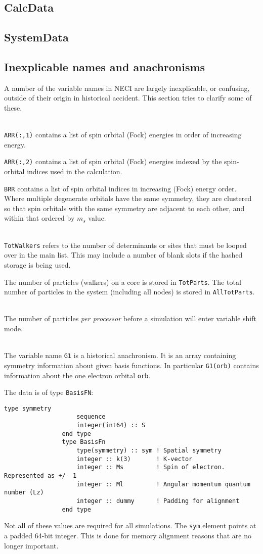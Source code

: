 \documentclass[a4paper,notitlepage]{scrreprt}
\newcommand\headitem[1]{\needspace{1.5\baselineskip}\item[{\boldmath #1 \nopagebreak}] \hfill \\ \nopagebreak}
\let\code\lstinline
\begin{document}
\subsection{\ttfamily CalcData}
\subsection{\ttfamily SystemData}

\subsection{Inexplicable names and anachronisms}
	A number of the variable names in NECI are largely inexplicable, or
	confusing, outside of their origin in historical accident. This section
	tries to clarify some of these.

	\begin{description}
		\headitem{ARR, BRR}
			\code{ARR(:,1)} contains a list of spin orbital (Fock)
			energies in	order of increasing energy.

			\code{ARR(:,2)} contains a list of spin orbital (Fock)
			energies indexed by the spin-orbital indices used in the
			calculation.

			\code{BRR} contains a list of spin orbital indices in
			increasing (Fock) energy order. Where multiple degenerate orbitals
			have the same symmetry, they are clustered so that spin orbitals
			with the same symmetry are adjacent to each other, and within that
			ordered by $m_s$ value.

		\headitem{TotWalkers and TotParts}
			\code{TotWalkers} refers to the number of determinants or
			sites that must be looped over in the main list. This may include
			a number of blank slots if the hashed storage is being used.

			The number of particles (walkers) on a core is stored in
			\code{TotParts}. The total number of particles in the system
			(including all nodes) is stored in \code{AllTotParts}.

		\headitem{InitWalkers}
			The number of particles \emph{per processor} before a simulation
			will enter variable shift mode.

		\headitem{G1}
			The variable name \code{G1} is a historical anachronism. It
			is an array containing symmetry information about given basis
			functions. In particular \code{G1(orb)} contains information
			about the one electron orbital \code{orb}.

			The data is of type \code{BasisFN}:
			\begin{lstlisting}[gobble=12]
				type symmetry
					sequence
					integer(int64) :: S
				end type
				type BasisFn
					type(symmetry) :: sym ! Spatial symmetry
					integer :: k(3)       ! K-vector
					integer :: Ms         ! Spin of electron. Represented as +/- 1
					integer :: Ml         ! Angular momentum quantum number (Lz)
					integer :: dummy      ! Padding for alignment
				end type
			\end{lstlisting}
			Not all of these values are required for all simulations. The
			\code{sym} element points at a padded 64-bit integer. This
			is done for memory alignment reasons that are no longer important.
	\end{description}
\end{document}
